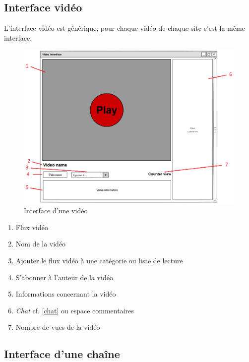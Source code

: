 \documentclass[11pt]{report} %
\begin{document}
		\newpage

		\subsection{Interface vidéo}
		L'interface vidéo est générique, pour chaque vidéo de chaque site c'est la même interface. 
		\begin{figure}[h]
			\center
			\includegraphics[width=1\textwidth]{../img/videoInterfacenum.png}
			\caption{Interface d'une vidéo}
			\label{interfacevideo}
		\end{figure}
		
		\begin{enumerate}
			\item Flux vidéo
			\item Nom de la vidéo
			\item Ajouter le flux vidéo à une catégorie ou liste de lecture
			\item S'abonner à l'auteur de la vidéo
			\item Informations concernant la vidéo
			\item \textit{Chat} cf. \ref{chat} ou espace commentaires
			\item Nombre de vues de la vidéo
		\end{enumerate}
		
		\newpage
		
		\subsection{Interface d'une chaîne}
		
\end{document}
